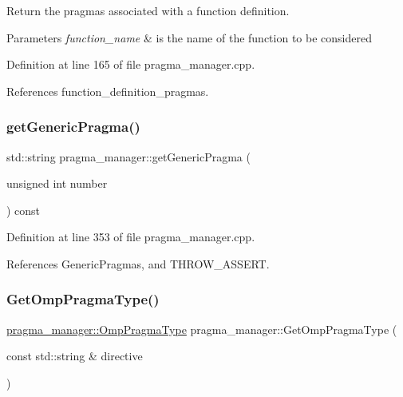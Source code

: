 Return the pragmas associated with a function definition. 


\begin{DoxyParams}{Parameters}
{\em function\+\_\+name} & is the name of the function to be considered \\
\hline
\end{DoxyParams}


Definition at line 165 of file pragma\+\_\+manager.\+cpp.



References function\+\_\+definition\+\_\+pragmas.

\mbox{\label{classpragma__manager_aa6718e446348d945f4b2ae1ff05202ee}} 
\subsubsection{\texorpdfstring{get\+Generic\+Pragma()}{getGenericPragma()}}
{\footnotesize\ttfamily std\+::string pragma\+\_\+manager\+::get\+Generic\+Pragma (\begin{DoxyParamCaption}\item[{unsigned int}]{number }\end{DoxyParamCaption}) const}



Definition at line 353 of file pragma\+\_\+manager.\+cpp.



References Generic\+Pragmas, and T\+H\+R\+O\+W\+\_\+\+A\+S\+S\+E\+RT.

\mbox{\label{classpragma__manager_a7810d8d6ef6bc3ee34d67f209cd277cf}} 
\subsubsection{\texorpdfstring{Get\+Omp\+Pragma\+Type()}{GetOmpPragmaType()}}
{\footnotesize\ttfamily \hyperlink{classpragma__manager_a181a86a91d4331ed5c884f9cec850238}{pragma\+\_\+manager\+::\+Omp\+Pragma\+Type} pragma\+\_\+manager\+::\+Get\+Omp\+Pragma\+Type (\begin{DoxyParamCaption}\item[{const std\+::string \&}]{directive }\end{DoxyParamCaption})\hspace{0.3cm}{\ttfamily [static]}}



